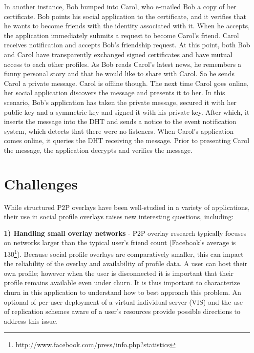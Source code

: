 \documentclass[conference]{IEEEtran}
\begin{document}
In another instance, Bob bumped into Carol, who e-mailed Bob a copy of her
certificate.  Bob points his social application to the certificate, and it
verifies that he wants to become friends with the identity associated with it.
When he accepts, the application immediately submits a request to become
Carol's friend.  Carol receives notification and accepts Bob's friendship
request.  At this point, both Bob and Carol have transparently exchanged signed
certificates and have mutual access to each other profiles.  As Bob reads
Carol's latest news, he remembers a funny personal story and that he would like
to share with Carol.  So he sends Carol a private message.  Carol is offline
though.  The next time Carol goes online, her social application discovers the
message and presents it to her.  In this scenario, Bob's application has taken
the private message, secured it with her public key and a symmetric key and
signed it with his private key.  After which, it inserts the message  into the
DHT and sends a notice to the event notification system, which detects that
there were no listeners.  When Carol's application comes online, it queries the
DHT receiving the message.  Prior to presenting Carol the message, the
application decrypts and verifies the message.

\section{Challenges}
\label{outstanding}

While structured P2P overlays have been well-studied in a variety of
applications, their use in social profile overlays raises new interesting
questions, including:

{\bf 1) Handling small overlay networks} - P2P overlay research typically
focuses on networks larger than the typical user's friend count (Facebook's
average is 130\footnote{http://www.facebook.com/press/info.php?statistics}).
Because social profile overlays are comparatively smaller, this can impact the
reliability of the overlay and availability of profile data.  A user can host
their own profile; however when the user is disconnected it is important that
their profile remains available even under churn. It is thus important to
characterize churn in this application to understand how to best approach this
problem. An optional of per-user deployment of a virtual individual server
(VIS) and the use of replication schemes aware of a user's resources provide
possible directions to address this issue.
\end{document}

